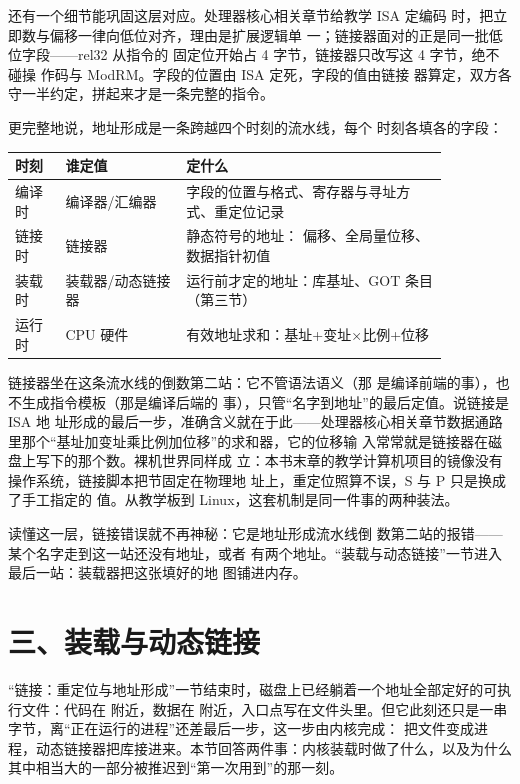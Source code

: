 还有一个细节能巩固这层对应。处理器核心相关章节给教学 ISA 定编码
时，把立即数与偏移一律向低位对齐，理由是扩展逻辑单
一；链接器面对的正是同一批低位字段——rel32 从指令的
固定位开始占 4 字节，链接器只改写这 4 字节，绝不碰操
作码与 ModRM。字段的位置由 ISA 定死，字段的值由链接
器算定，双方各守一半约定，拼起来才是一条完整的指令。

更完整地说，地址形成是一条跨越四个时刻的流水线，每个
时刻各填各的字段：

\begin{longtable}{L{0.1\linewidth}L{0.24\linewidth}L{0.52\linewidth}}
\toprule
时刻 & 谁定值 & 定什么 \\
\midrule
编译时 & 编译器/汇编器 & 字段的位置与格式、寄存器与寻址方式、重定位记录 \\\tablerowrule
链接时 & 链接器 & 静态符号的地址： 偏移、全局量位移、数据指针初值 \\\tablerowrule
装载时 & 装载器/动态链接器 & 运行前才定的地址：库基址、GOT 条目（第三节） \\\tablerowrule
运行时 & CPU 硬件 & 有效地址求和：基址+变址×比例+位移 \\
\bottomrule
\end{longtable}

链接器坐在这条流水线的倒数第二站：它不管语法语义（那
是编译前端的事），也不生成指令模板（那是编译后端的
事），只管“名字到地址”的最后定值。说链接是 ISA 地
址形成的最后一步，准确含义就在于此——处理器核心相关章节数据通路
里那个“基址加变址乘比例加位移”的求和器，它的位移输
入常常就是链接器在磁盘上写下的那个数。裸机世界同样成
立：本书末章的教学计算机项目的镜像没有操作系统，链接脚本把节固定在物理地
址上，重定位照算不误，S 与 P 只是换成了手工指定的
值。从教学板到 Linux，这套机制是同一件事的两种装法。

读懂这一层，链接错误就不再神秘：它是地址形成流水线倒
数第二站的报错——某个名字走到这一站还没有地址，或者
有两个地址。“装载与动态链接”一节进入最后一站：装载器把这张填好的地
图铺进内存。

\section{三、装载与动态链接}

“链接：重定位与地址形成”一节结束时，磁盘上已经躺着一个地址全部定好的可执行文件：代码在  附近，数据在  附近，入口点写在文件头里。但它此刻还只是一串字节，离“正在运行的进程”还差最后一步，这一步由内核完成： 把文件变成进程，动态链接器把库接进来。本节回答两件事：内核装载时做了什么，以及为什么其中相当大的一部分被推迟到“第一次用到”的那一刻。

